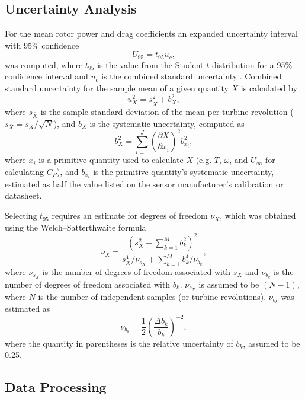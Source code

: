 \documentclass[10pt,letterpaper]{article}
\begin{document}
\subsection*{Uncertainty Analysis}

For the mean rotor power and drag coefficients an expanded uncertainty interval
with 95\% confidence
\begin{equation}
    U_{95} = t_{95} u_c,
\end{equation}
was computed, where $t_{95}$ is the value from the Student-$t$ distribution for
a 95\% confidence interval and $u_c$ is the combined standard uncertainty
\cite{ColemanSteele}. Combined standard uncertainty for the sample mean of a
given quantity $X$ is calculated by
\begin{equation}
    u_X^2 = s_{\bar{X}}^2 + b_X^2,
\end{equation}
where $s_{\bar{X}}$ is the sample standard deviation of the mean per turbine
revolution ($s_{\bar{X}} = s_X/\sqrt{N}$), and $b_X$ is the systematic
uncertainty, computed as
\begin{equation}
    b_{X}^2 = \sum_{i=1}^J \left( \frac{\partial X}{\partial x_i} \right)^2
    b_{x_i}^2,
\end{equation}
where $x_i$ is a primitive quantity used to calculate $X$ (e.g. $T$, $\omega$,
and $U_\infty$ for calculating $C_P$), and $b_{x_i}$ is the primitive quantity's
systematic uncertainty, estimated as half the value listed on the sensor
manufacturer's calibration or datasheet.

Selecting $t_{95}$ requires an estimate for degrees of freedom $\nu_X$, which
was obtained using the Welch--Satterthwaite formula
\begin{equation}
    \nu_X = \frac{\left(s_X^2 + \sum_{k=1}^M b_k^2 \right)^2} {s_X^4/\nu_{s_X} +
    \sum_{k=1}^M b_k^4/\nu_{b_k}},
\end{equation}
where $\nu_{s_X}$ is the number of degrees of freedom associated with $s_X$ and
$\nu_{b_k}$ is the number of degrees of freedom associated with $b_k$.
$\nu_{s_X}$ is assumed to be $(N-1)$, where $N$ is the number of independent
samples (or turbine revolutions). $\nu_{b_k}$ was estimated as
\begin{equation}
    \nu_{b_k} = \frac{1}{2} \left( \frac{\Delta b_k}{b_k} \right)^{-2},
\end{equation}
where the quantity in parentheses is the relative uncertainty of $b_k$, assumed
to be 0.25.


\subsection*{Data Processing}
\end{document}
